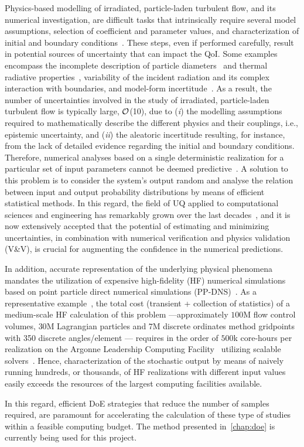 Physics-based modelling of irradiated, particle-laden turbulent flow, and its numerical investigation, are difficult tasks that intrinsically require several model assumptions, selection of coefficient and parameter values, and characterization of initial and boundary conditions~\citep{Jofre2017-A}.
These steps, even if performed carefully, result in potential sources of uncertainty that can impact the QoI.
Some examples encompass the incomplete description of particle diameters~\citep{Rahmani2018-A} and thermal radiative properties~\citep{Frankel2017-A}, variability of the incident radiation and its complex interaction with boundaries, and model-form incertitude~\citep{Jofre2018-A}.
As a result, the number of uncertainties involved in the study of irradiated, particle-laden turbulent flow is typically large, ${\cal O}$(10), due to (\emph{i}) the modelling assumptions required to mathematically describe the different physics and their couplings, i.e., epistemic uncertainty, and (\emph{ii}) the aleatoric incertitude resulting, for instance, from the lack of detailed evidence regarding the initial and boundary conditions.
Therefore, numerical analyses based on a single deterministic realization for a particular set of input parameters cannot be deemed predictive~\citep{Roache1997-A}.
A solution to this problem is to consider the system's output random and analyse the relation between input and output probability distributions by means of efficient statistical methods.
In this regard, the field of UQ applied to computational sciences and engineering has remarkably grown over the last decades~\citep{Najm2009-A,Chernatynskiy2013-A,Beran2017-A}, and it is now extensively accepted that the potential of estimating and minimizing uncertainties, in combination with numerical verification and physics validation (V\&V), is crucial for augmenting the confidence in the numerical predictions.

In addition, accurate representation of the underlying physical phenomena mandates the utilization of expensive high-fidelity (HF) numerical simulations based on point particle direct numerical simulations (PP-DNS)~\citep{Subramaniam2013-A}.
As a representative example~\citep{Jofre2017-A}, the total cost (transient + collection of statistics) of a medium-scale HF calculation of this problem ---\thinspace approximately $100$M flow control volumes, $30$M Lagrangian particles and $7$M discrete ordinates method gridpoints with 350 discrete angles/element \thinspace--- requires in the order of $500$k core-hours per realization on the Argonne Leadership Computing Facility~\citep{Mira-O} utilizing scalable solvers~\citep{Esmaily2018-A}.
Hence, characterization of the stochastic output by means of naively running hundreds, or thousands, of HF realizations with different input values easily exceeds the resources of the largest computing facilities available.

In this regard, efficient DoE strategies that reduce the number of samples required, are paramount for accelerating the calculation of these type of studies within a feasible computing budget. The method presented in~\cref{chap:doe} is currently being used for this project.


